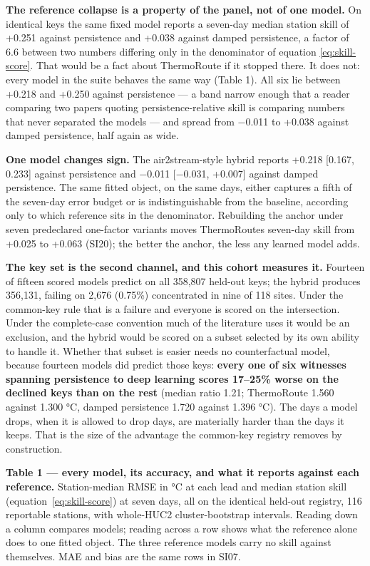 \textbf{The reference collapse is a property of the panel, not of one model.} On
identical keys the same fixed model reports a seven-day median station skill of
+0.251 against persistence and +0.038 against damped persistence, a factor of
6.6 between two numbers differing only in the denominator of equation
\eqref{eq:skill-score}. That
would be a fact about ThermoRoute if it stopped there. It does not: every model
in the suite behaves the same way (Table 1). All six lie between +0.218 and
+0.250 against persistence --- a band narrow enough that a reader comparing two
papers quoting persistence-relative skill is comparing numbers that never
separated the models --- and spread from −0.011 to +0.038 against damped
persistence, half again as wide.

\textbf{One model changes sign.} The air2stream-style hybrid reports +0.218
{[}0.167, 0.233{]} against persistence and −0.011 {[}−0.031, +0.007{]} against damped
persistence. The same fitted object, on the same days, either captures a fifth
of the seven-day error budget or is indistinguishable from the baseline,
according only to which reference sits in the denominator. Rebuilding the anchor
under seven predeclared one-factor variants moves ThermoRoute\textquotesingle s seven-day skill
from +0.025 to +0.063 (SI20); the better
the anchor, the less any learned model adds.

\textbf{The key set is the second channel, and this cohort measures it.} Fourteen of
fifteen scored models predict on all 358,807 held-out keys; the hybrid produces
356,131, failing on 2,676 (0.75\%) concentrated in nine of 118 sites. Under the
common-key rule that is a failure and everyone is scored on the intersection.
Under the complete-case convention much of the literature uses it would be an
exclusion, and the hybrid would be scored on a subset selected by its own
ability to handle it. Whether that subset is easier needs no counterfactual
model, because fourteen models did predict those keys: \textbf{every one of six
witnesses spanning persistence to deep learning scores 17--25\% worse on the
declined keys than on the rest} (median ratio 1.21; ThermoRoute 1.560 against
1.300 °C, damped persistence 1.720 against 1.396 °C). The days a model drops, when it is
allowed to drop days, are materially harder than the days it keeps. That is the
size of the advantage the common-key registry removes by construction.

\textbf{Table 1 --- every model, its accuracy, and what it reports against each
reference.} Station-median RMSE in °C at each lead and median station skill
(equation~\eqref{eq:skill-score}) at seven days, all on the identical held-out registry, 116
reportable stations, with whole-HUC2 cluster-bootstrap intervals. Reading down a
column compares models; reading across a row shows what the reference alone does
to one fitted object. The three reference models carry no skill against
themselves. MAE and bias are the same rows in SI07.

